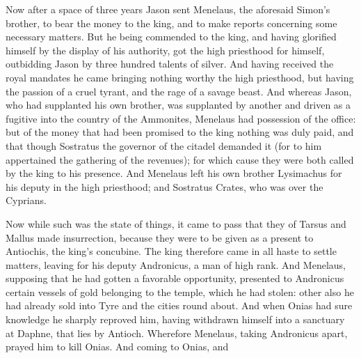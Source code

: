 {\par }{\PP {}Now after a space of three years Jason sent Menelaus, the aforesaid Simon’s brother, to bear the money to the king, and to
 make reports concerning some necessary matters.
But he being commended to the king, and
 having glorified
 himself
 by the display of his authority, got the high priesthood for himself, outbidding Jason by three hundred talents of silver.
And having received the royal mandates he came
{} bringing nothing worthy the high priesthood, but having the passion of a cruel tyrant, and the rage of a savage beast.
And whereas Jason, who had supplanted his own brother, was supplanted by another and driven as a fugitive into the country of the Ammonites,
Menelaus had possession of the office: but of the money that had been promised to the king nothing
 was duly paid, and that though Sostratus the governor of the citadel demanded it
(for to him appertained the gathering of the revenues); for which cause they were both called by the king to his presence.
And Menelaus left his own brother Lysimachus for his
 deputy in the high priesthood; and Sostratus
{} Crates, who was over the Cyprians.
\par }{\PP {}Now while such was the state of things, it came to pass that they of Tarsus and Mallus made insurrection, because they were to be given as a present to Antiochis, the king’s concubine.
The king therefore came
{} in all haste to settle matters, leaving for his
 deputy Andronicus, a man of high rank.
And Menelaus, supposing that he had gotten a favorable opportunity, presented to Andronicus certain vessels of gold belonging to the temple, which he had stolen: other
{} also he had already sold into Tyre and the cities round about.
And when Onias had sure knowledge
{} he sharply reproved him, having withdrawn himself into a sanctuary at Daphne, that lies by Antioch.
Wherefore Menelaus, taking Andronicus apart, prayed him
 to kill Onias. And coming to Onias, and
}

